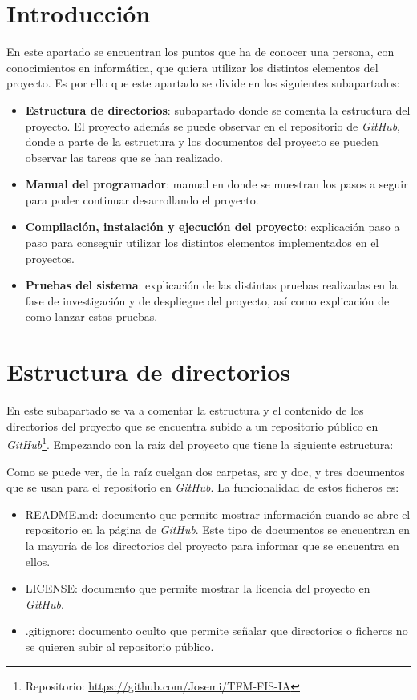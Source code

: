 
\section{Introducción}
En este apartado se encuentran los puntos que ha de conocer una persona, con conocimientos en informática, que quiera utilizar los distintos elementos del proyecto. Es por ello que este apartado se divide en los siguientes subapartados:
\begin{itemize}
	\item \textbf{Estructura de directorios}: subapartado donde se comenta la estructura del proyecto. El proyecto además se puede observar en el repositorio de \textit{GitHub}, donde a parte de la estructura y los documentos del proyecto se pueden observar las tareas que se han realizado.
	\item \textbf{Manual del programador}: manual en donde se muestran los pasos a seguir para poder continuar desarrollando el proyecto.
	\item \textbf{Compilación, instalación y ejecución del proyecto}: explicación paso a paso para conseguir utilizar los distintos elementos implementados en el proyectos.
	\item \textbf{Pruebas del sistema}: explicación de las distintas pruebas realizadas en la fase de investigación y de despliegue del proyecto, así como explicación de como lanzar estas pruebas.
\end{itemize}
\section{Estructura de directorios}
En este subapartado se va a comentar la estructura y el contenido de los directorios del proyecto que se encuentra subido a un repositorio público en \textit{GitHub}\footnote{Repositorio: \href{https://github.com/Josemi/TFM-FIS-IA}{https://github.com/Josemi/TFM-FIS-IA}}. Empezando con la raíz del proyecto que tiene la siguiente estructura:

Como se puede ver, de la raíz cuelgan dos carpetas, src y doc, y tres documentos que se usan para el repositorio en \textit{GitHub}. La funcionalidad de estos ficheros es:
\begin{itemize}
	\item README.md: documento que permite mostrar información cuando se abre el repositorio en la página de \textit{GitHub}. Este tipo de documentos se encuentran en la mayoría de los directorios del proyecto para informar que se encuentra en ellos.
	\item LICENSE: documento que permite mostrar la licencia del proyecto en \textit{GitHub}.
	\item .gitignore: documento oculto que permite señalar que directorios o ficheros no se quieren subir al repositorio público.
\end{itemize}

